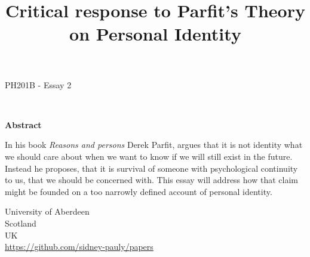 \documentclass[14pt]{article}
\begin{document}
\title{Critical response to Parfit's Theory on Personal Identity}
\date{}




\fancyhf{}



\begin{titlepage}
  \begin{center}
    \Large
    \textbf{\thetitle}
        
    \vspace{0.4cm}
    \large
    PH201B - Essay 2
        
    \vspace{0.4cm}
    \textbf{\theauthor}\\
    \textbf{\theuoastudentid}

    \vspace{2cm}
    \textbf{Abstract}

  \end{center}

  In his book \textit{Reasons and persons} Derek Parfit, argues that it is not identity what we should care about when we want to know if we will still
  exist in the future. Instead he proposes, that it is survival of someone with psychological continuity to us, that we should be concerned with. This essay will
  address how that claim might be founded on a too narrowly defined account of personal identity.
  
  \vfill

  \begin{center}

    University of Aberdeen\\
    Scotland\\
    UK\\
    \thedate
    \vspace{0.4cm}
    \url{https://github.com/sidney-pauly/papers}
  \end{center}
\end{titlepage}
\end{document}
